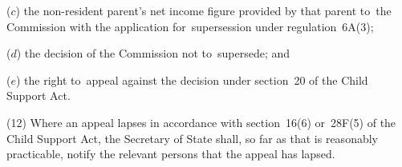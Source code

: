 \documentclass[12pt,a4paper]{article}
\begin{document}
{\begin{enumerate}
($c$) the non-resident parent’s net income figure provided by that parent to~the 
Commission  %
with the application for~supersession under regulation~6A(3);

($d$) the decision of the 
Commission  %
not to~supersede; and

($e$) the right to~appeal against the decision under section~20 of the Child Support Act.
\end{enumerate}

(12) Where an appeal lapses in accordance with section~16(6) or~28F(5) of the Child Support Act, the Secretary of State shall, so far as that is reasonably practicable, notify the relevant persons that the appeal has lapsed.


}
\end{document}
